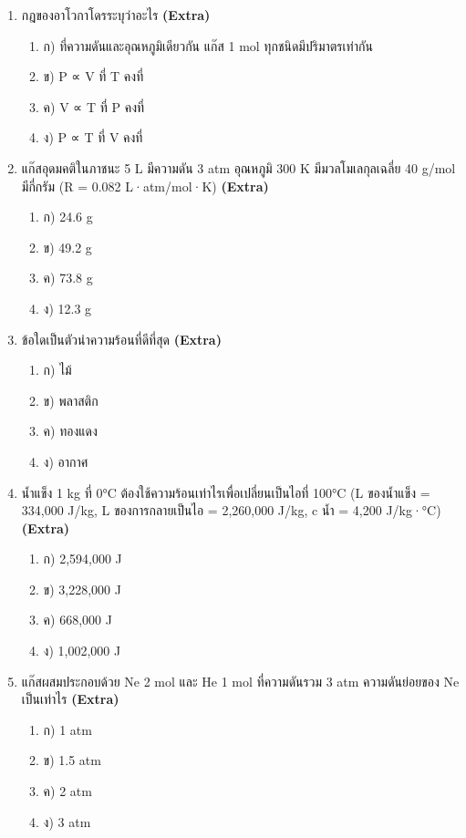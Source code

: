 \documentclass[12pt]{article}
\begin{document}
\begin{enumerate}[label=\arabic*.]
\begin{enumerate}[label=)]
\end{enumerate}
\item กฎของอาโวกาโดรระบุว่าอะไร \hfill \textbf{\small (Extra)}
\begin{enumerate}[label=)]
\item ก) ที่ความดันและอุณหภูมิเดียวกัน แก๊ส 1 mol ทุกชนิดมีปริมาตรเท่ากัน
\item ข) P ∝ V ที่ T คงที่
\item ค) V ∝ T ที่ P คงที่
\item ง) P ∝ T ที่ V คงที่
\end{enumerate}
\item แก๊สอุดมคติในภาชนะ 5 L มีความดัน 3 atm อุณหภูมิ 300 K มีมวลโมเลกุลเฉลี่ย 40 g/mol มีกี่กรัม (R = 0.082 L·atm/mol·K) \hfill \textbf{\small (Extra)}
\begin{enumerate}[label=)]
\item ก) 24.6 g
\item ข) 49.2 g
\item ค) 73.8 g
\item ง) 12.3 g
\end{enumerate}
\item ข้อใดเป็นตัวนำความร้อนที่ดีที่สุด \hfill \textbf{\small (Extra)}
\begin{enumerate}[label=)]
\item ก) ไม้
\item ข) พลาสติก
\item ค) ทองแดง
\item ง) อากาศ
\end{enumerate}
\item น้ำแข็ง 1 kg ที่ 0°C ต้องใช้ความร้อนเท่าไรเพื่อเปลี่ยนเป็นไอที่ 100°C (L ของน้ำแข็ง = 334,000 J/kg, L ของการกลายเป็นไอ = 2,260,000 J/kg, c น้ำ = 4,200 J/kg·°C) \hfill \textbf{\small (Extra)}
\begin{enumerate}[label=)]
\item ก) 2,594,000 J
\item ข) 3,228,000 J
\item ค) 668,000 J
\item ง) 1,002,000 J
\end{enumerate}
\item แก๊สผสมประกอบด้วย Ne 2 mol และ He 1 mol ที่ความดันรวม 3 atm ความดันย่อยของ Ne เป็นเท่าไร \hfill \textbf{\small (Extra)}
\begin{enumerate}[label=)]
\item ก) 1 atm
\item ข) 1.5 atm
\item ค) 2 atm
\item ง) 3 atm
\end{enumerate}
\end{enumerate}
\end{document}
